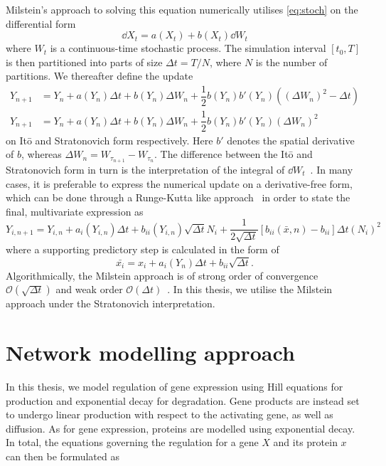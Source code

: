 Milstein's approach to solving this equation numerically utilises
\cref{eq:stoch} on the differential form 
\begin{equation}
  \dd X_t = a(X_t) + b(X_t) \dd W_t
  \label{eq:milstein_form}
\end{equation}
where $W_t$ is a continuous-time stochastic process. The simulation interval
$\left[ t_0, T \right]$is then partitioned into parts of size $\Delta t = T /
N$, where $N$ is the number of partitions. We thereafter define the update
\begin{align}
  Y_{n+1} &= Y_n + 
  a(Y_n)\Delta t + 
  b(Y_n)\Delta W_n +
  \dfrac{1}{2}b(Y_n)b'(Y_n)\left( \left( \Delta W_n \right)^2 - \Delta t \right) \\
  Y_{n+1} &= Y_n + 
  a(Y_n)\Delta t + 
  b(Y_n)\Delta W_n + 
  \dfrac{1}{2} b(Y_n)b'(Y_n) \left(\Delta W_n\right)^2 
  \label{eq:milstein_deriv}
\end{align}
on It\={o} and Stratonovich form respectively. Here $b'$ denotes the spatial
derivative of $b$, whereas $\Delta W_n = W_{\tau_{n+1}} - W_{\tau_n}$. The
difference between the It\={o} and Stratonovich form in turn is the
interpretation of the integral of $\dd W_t$~\cite{klimontovich1990ito}. In many cases, it is
preferable to express the numerical update on a derivative-free form, which can
be done through a Runge-Kutta like approach~\cite{garcia2011comparison} in order to state the final,
multivariate expression as 
\begin{equation}
  Y_{i, n+1} = Y_{i, n} + a_i\left( Y_{i,n} \right) \Delta t + 
  b_{ii}(Y_{i,n}) \sqrt{\Delta t} N_i + \dfrac{1}{2\sqrt{\Delta t}} \left[
    b_{ii}(\bar x, n) - b_{ii} \right]
  \Delta t (N_i)^2 
  \label{eq:milstein_deriv_free}
\end{equation}
where a supporting predictory step is calculated in the form of 
\begin{equation}
  \bar {x_i} = x_i + a_i\left( Y_n \right)\Delta t + b_{ii}\sqrt {\Delta t}.
  \label{eq:milstein_predictor}
\end{equation}
Algorithmically, the Milstein approach is of strong order of convergence
$\mathcal O \left( \sqrt{\Delta t }\right)$ and weak order $\mathcal O \left(
  \Delta t \right)$~\cite{garcia2011comparison}. In this thesis, we utilise the Milstein approach under the
Stratonovich interpretation.

\section{Network modelling approach}
\label{sec:modelling_approach}
In this thesis, we model regulation of gene expression using Hill equations for
production and exponential decay for degradation. Gene products are instead
set to undergo linear production with respect to the activating gene, as well as
diffusion. As for gene expression, proteins are modelled using exponential
decay. In total, the equations governing the regulation for a gene $X$ and its
protein $x$ can then be formulated as


